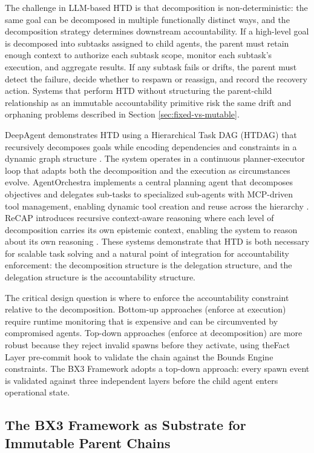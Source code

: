 The challenge in LLM-based HTD is that decomposition is non-deterministic: the same goal can be decomposed in multiple functionally distinct ways, and the decomposition strategy determines downstream accountability. If a high-level goal is decomposed into subtasks assigned to child agents, the parent must retain enough context to authorize each subtask scope, monitor each subtask's execution, and aggregate results. If any subtask fails or drifts, the parent must detect the failure, decide whether to respawn or reassign, and record the recovery action. Systems that perform HTD without structuring the parent-child relationship as an immutable accountability primitive risk the same drift and orphaning problems described in Section \ref{sec:fixed-vs-mutable}.

DeepAgent demonstrates HTD using a Hierarchical Task DAG (HTDAG) that recursively decomposes goals while encoding dependencies and constraints in a dynamic graph structure \cite{deepagent2025}. The system operates in a continuous planner-executor loop that adapts both the decomposition and the execution as circumstances evolve. AgentOrchestra implements a central planning agent that decomposes objectives and delegates sub-tasks to specialized sub-agents with MCP-driven tool management, enabling dynamic tool creation and reuse across the hierarchy \cite{agentorchestra2025}. ReCAP introduces recursive context-aware reasoning where each level of decomposition carries its own epistemic context, enabling the system to reason about its own reasoning \cite{recap2025}. These systems demonstrate that HTD is both necessary for scalable task solving and a natural point of integration for accountability enforcement: the decomposition structure is the delegation structure, and the delegation structure is the accountability structure.

The critical design question is where to enforce the accountability constraint relative to the decomposition. Bottom-up approaches (enforce at execution) require runtime monitoring that is expensive and can be circumvented by compromised agents. Top-down approaches (enforce at decomposition) are more robust because they reject invalid spawns before they activate, using theFact Layer pre-commit hook to validate the chain against the Bounds Engine constraints. The BX3 Framework adopts a top-down approach: every spawn event is validated against three independent layers before the child agent enters operational state.

\subsection{The BX3 Framework as Substrate for Immutable Parent Chains}
\label{sec:bx3-framework}

